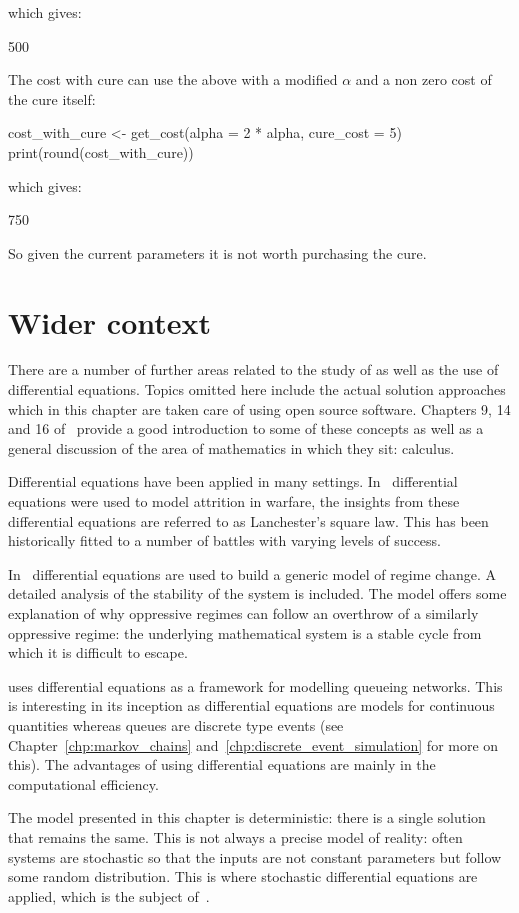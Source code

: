 which gives:

\begin{Rout}
[1] 500
\end{Rout}

The cost with cure can use the above with a modified \(\alpha\) and a non zero
cost of the cure itself:

\begin{Rin}
cost_with_cure <- get_cost(alpha = 2 * alpha, cure_cost = 5)
print(round(cost_with_cure))
\end{Rin}

which gives:

\begin{Rout}
[1] 750
\end{Rout}

So given the current parameters it is not worth purchasing the cure.

\section{Wider context}\label{sec:differential_equations_wider_context}

There are a number of further areas related to the study of as well as the use
of differential equations. Topics omitted here include the actual solution
approaches which in this chapter are taken
care of using open source software. Chapters 9, 14 and 16
of~\cite{stewart2009calculus} provide a good introduction to some of
these concepts as well as a general discussion of the area of mathematics in
which they sit: calculus.

Differential equations have been applied in many settings.
In~\cite{lanchester1916aircraft} differential equations were used to model
attrition in warfare, the insights from these differential equations are
referred to as Lanchester's square law. This has been historically fitted to a
number of battles with varying levels of success.

In~\cite{syms2015dynamic} differential equations are used to build a
generic model of regime change. A detailed analysis of the stability of the
system is included. The model offers some explanation of why oppressive regimes
can follow an overthrow of a similarly oppressive regime: the underlying
mathematical system is a stable cycle from which it is difficult to escape.

\cite{vandergraft1983fluid} uses differential equations as a framework for
modelling queueing networks. This is interesting in its inception as
differential equations are models for continuous quantities whereas queues are
discrete type events (see Chapter~\ref{chp:markov_chains}
and~\ref{chp:discrete_event_simulation} for more on this). The advantages of
using differential equations are mainly in the computational efficiency.

The model presented in this chapter is deterministic: there is a single solution
that remains the same. This is not always a precise model of reality: often
systems are stochastic so that the inputs are not constant parameters but follow
some random distribution. This is where stochastic differential equations are
applied, which is the subject of~\cite{sarkka2019applied}.
